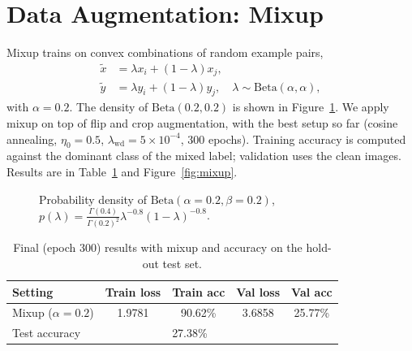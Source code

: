 \documentclass[letterpaper]{article}
\begin{document}
\section{Data Augmentation: Mixup}
Mixup \cite{zhang2018} trains on convex combinations of random example pairs,
\begin{equation}
\begin{aligned}
\tilde{x}&=\lambda x_i+(1-\lambda)x_j,\\
\tilde{y}&=\lambda y_i+(1-\lambda)y_j,\quad
\lambda\sim\mathrm{Beta}(\alpha,\alpha),
\end{aligned}
\end{equation}
with $\alpha=0.2$. The density of $\mathrm{Beta}(0.2,0.2)$ is shown in Figure~\ref{fig:beta}. We apply mixup on top of flip and crop augmentation, with the best setup so far (cosine annealing, $\eta_0=0.5$, $\lambda_{\mathrm{wd}}=5\times10^{-4}$, 300 epochs). Training accuracy is computed against the dominant class of the mixed label; validation uses the clean images. Results are in Table~\ref{tab:mixup} and Figure~\ref{fig:mixup}.

\begin{figure}[ht]
\centering
{}
\caption{Probability density of $\mathrm{Beta}(\alpha{=}0.2,\beta{=}0.2)$, $p(\lambda)=\frac{\Gamma(0.4)}{\Gamma(0.2)^2}\lambda^{-0.8}(1-\lambda)^{-0.8}$.}
\label{fig:beta}
\end{figure}

\begin{table}[ht]
\centering
\footnotesize\setlength{\tabcolsep}{3pt}
\begin{tabular}{lcccc}
\toprule
Setting & Train loss & Train acc & Val loss & Val acc\\
\midrule
Mixup ($\alpha=0.2$) & 1.9781 & 90.62\% & 3.6858 & 25.77\%\\
\midrule
\multicolumn{2}{l}{Test accuracy} & \multicolumn{3}{l}{27.38\%}\\
\bottomrule
\end{tabular}
\caption{Final (epoch 300) results with mixup and accuracy on the hold-out test set.}
\label{tab:mixup}
\end{table}
\end{document}
